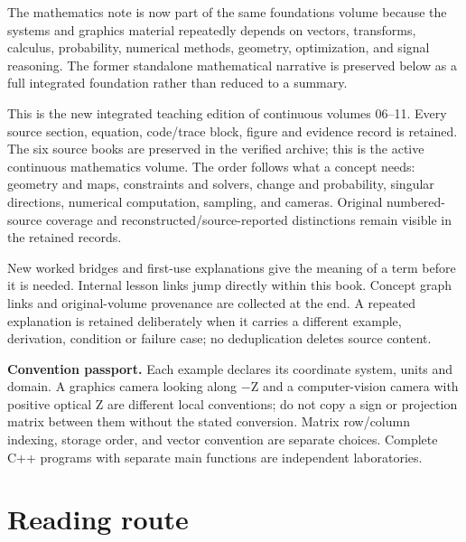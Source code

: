 The mathematics note is now part of the same foundations volume because the systems and graphics material repeatedly depends on vectors, transforms, calculus, probability, numerical methods, geometry, optimization, and signal reasoning. The former standalone mathematical narrative is preserved below as a full integrated foundation rather than reduced to a summary.

This is the new integrated teaching edition of continuous volumes 06--11. Every source section, equation, code/trace block, figure and evidence record is retained. The six source books are preserved in the verified archive; this is the active continuous mathematics volume. The order follows what a concept needs: geometry and maps, constraints and solvers, change and probability, singular directions, numerical computation, sampling, and cameras. Original numbered-source coverage and reconstructed/source-reported distinctions remain visible in the retained records.

New worked bridges and first-use explanations give the meaning of a term before it is needed. Internal lesson links jump directly within this book. Concept graph links and original-volume provenance are collected at the end. A repeated explanation is retained deliberately when it carries a different example, derivation, condition or failure case; no deduplication deletes source content.

\textbf{Convention passport.} Each example declares its coordinate system, units and domain. A graphics camera looking along −Z and a computer-vision camera with positive optical Z are different local conventions; do not copy a sign or projection matrix between them without the stated conversion. Matrix row/column indexing, storage order, and vector convention are separate choices. Complete C++ programs with separate main functions are independent laboratories.

\section{Reading route}\label{01-foundations-i-ch017-reading-route}

